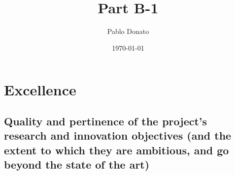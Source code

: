 \documentclass[12pt,draftproposal]{msca-pf}
\title{Part B-1}
\author{Pablo Donato}
\date{\today}
\begin{document}
\maketitle



\section{Excellence }
\label{sc:excellence}

\subsection{Quality and pertinence of the project's research and innovation objectives
    (and the extent to which they are ambitious, and go beyond the state of the art)}
\label{ssc:excellence:quality}
\end{document}
